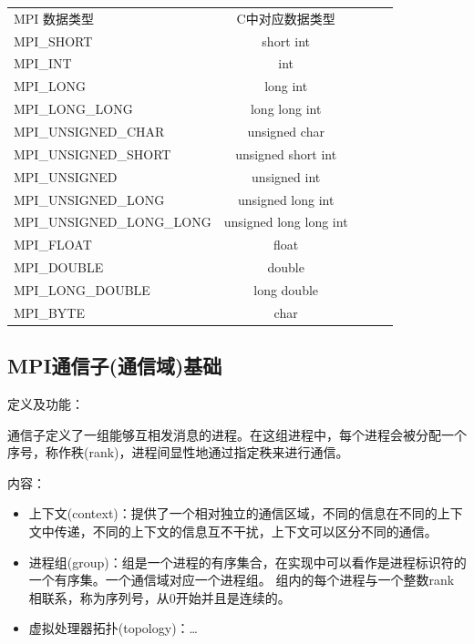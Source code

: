 \documentclass[UTF8]{article}%
\begin{document}
\begin{tabular}{l c c c r}
    MPI 数据类型                 &	C中对应数据类型           \\
    MPI\_SHORT                  &	short int               \\
    MPI\_INT	                &   int                     \\
    MPI\_LONG	                &   long int                \\
    MPI\_LONG\_LONG	            &   long long int           \\
    MPI\_UNSIGNED\_CHAR         &	unsigned char           \\
    MPI\_UNSIGNED\_SHORT	    &   unsigned short int      \\
    MPI\_UNSIGNED	            &   unsigned int            \\
    MPI\_UNSIGNED\_LONG	        &   unsigned long int       \\
    MPI\_UNSIGNED\_LONG\_LONG	&   unsigned long long int  \\
    MPI\_FLOAT	                &   float                   \\
    MPI\_DOUBLE	                &   double                  \\
    MPI\_LONG\_DOUBLE	        &   long double             \\
    MPI\_BYTE	                &   char                    \\
\end{tabular}


\subsection{MPI通信子(通信域)基础}

定义及功能：

通信子定义了一组能够互相发消息的进程。在这组进程中，每个进程会被分配一个序号，称作秩(rank)，进程间显性地通过指定秩来进行通信。

内容：
\begin{itemize}
    \item 上下文(context)：提供了一个相对独立的通信区域，不同的信息在不同的上下文中传递，不同的上下文的信息互不干扰，上下文可以区分不同的通信。
    \item 进程组(group)：组是一个进程的有序集合，在实现中可以看作是进程标识符的一个有序集。一个通信域对应一个进程组。
组内的每个进程与一个整数rank相联系，称为序列号，从0开始并且是连续的。
    \item 虚拟处理器拓扑(topology)：\dots
\end{itemize}
\end{document}
